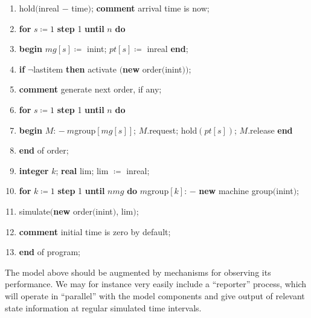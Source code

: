 \documentclass[twoside,11pt]{book}
\begin{document}
\begin{enumerate}[nosep, label=\arabic*.]
	\item \label{pg:program-job-shop-15}
	\quad hold$($inreal $-$ time$)$; \textbf{comment} arrival time is now;
	
	\item \label{pg:program-job-shop-16}
	\quad \textbf{for} $s\coloneq 1$ \textbf{step} 1 \textbf{until} $n$ \textbf{do}
	
	\item \label{pg:program-job-shop-17}
	\quad \textbf{begin} $mg[s]\coloneq$ inint; $pt[s]\coloneq$ inreal \textbf{end};
	
	\item \label{pg:program-job-shop-18}
	\quad \textbf{if} $\neg$lastitem \textbf{then} activate $($\textbf{new} order$($inint$))$;
	
	\item \label{pg:program-job-shop-19}
	\quad \textbf{comment} generate next order, if any;
	
	\item \label{pg:program-job-shop-20}
	\quad \textbf{for} $s\coloneq 1$ \textbf{step} 1 \textbf{until} $n$ \textbf{do}
	
	\item \label{pg:program-job-shop-21}
	\quad \textbf{begin} $M$: $-\ m$group$[mg[s]]$; $M$.request; hold$(pt[s])$; $M$.release \textbf{end}
	
	\item \label{pg:program-job-shop-22}
	\textbf{end} of order;
	
	\item \label{pg:program-job-shop-23}
	\textbf{integer} $k$; \textbf{real} lim; lim $\coloneq$ inreal;
	
	\item \label{pg:program-job-shop-24}
	\textbf{for} $k\coloneq 1$ \textbf{step} 1 \textbf{until} $nmg$ \textbf{do} $m$group$[k]$: $-$ \textbf{new} machine group$($inint$)$;
	
	\item \label{pg:program-job-shop-25}
	simulate$($\textbf{new} order$($inint$)$, lim$)$;
	
	\item \label{pg:program-job-shop-26}
	\textbf{comment} initial time is zero by default;
	
	\item \label{pg:program-job-shop-27}
	\textbf{end} of program;
\end{enumerate}

The model above should be augmented by mechanisms for observing its performance. We may for instance very easily include a ``reporter'' process, which will operate in ``parallel'' with the model components and give output of relevant state information at regular simulated time intervals.
\end{document}

